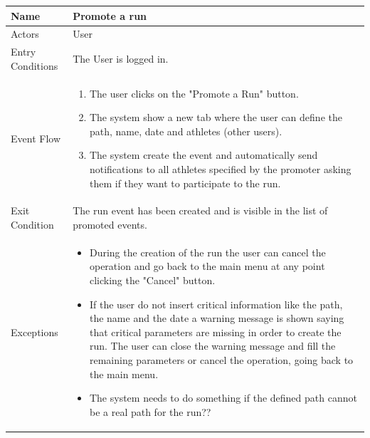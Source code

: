 \begin{enumerate}
\FloatBarrier
\begin{table}[h]
\begin{tabular}{|l|p{}|}
\hline
Name             & Promote a run \\ \hline
Actors           & User  \\ \hline
Entry Conditions & The User is logged in.    \\ \hline
Event Flow       & \begin{enumerate}
            \item The user clicks on the "Promote a Run" button.
            \item The system show a new tab where the user can define the path, name, date and athletes (other users).
            \item The system create the event and automatically send notifications to all athletes specified by the promoter asking them if they want to participate to the run.
        \end{enumerate}\\ \hline
Exit Condition   & The run event has been created and is visible in the list of promoted events.\\ \hline
Exceptions       & \begin{itemize}
\item During the creation of the run the user can cancel the operation and go back to the main menu at any point clicking the "Cancel" button.
\item If the user do not insert critical information like the path, the name and the date a warning message is shown saying that critical parameters are missing in order to create the run. The user can close the warning message and fill the remaining parameters or cancel the operation, going back to the main menu.
\item The system needs to do something if the defined path cannot be a real path for the run??
\end{itemize}\\ \hline
\end{tabular}
\end{table}
\FloatBarrier


\end{enumerate}
